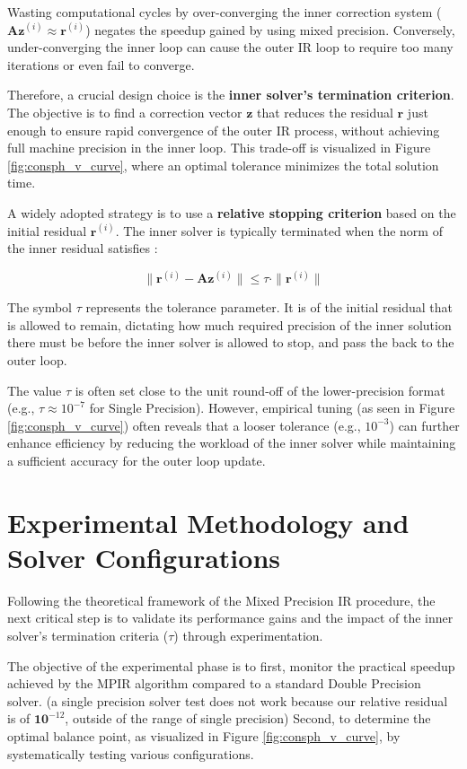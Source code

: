 \documentclass[a4paper,10.5pt,twoside]{article}
\begin{document}
Wasting computational cycles by over-converging the inner correction system ($\mathbf{A}\mathbf{z}^{(i)} \approx \mathbf{r}^{(i)}$) negates the speedup gained by using mixed precision. Conversely, under-converging the inner loop can cause the outer IR loop to require too many iterations or even fail to converge.

Therefore, a crucial design choice is the \textbf{inner solver's termination criterion}. The objective is to find a correction vector $\mathbf{z}$ that reduces the residual $\mathbf{r}$ just enough to ensure rapid convergence of the outer IR process, without achieving full machine precision in the inner loop. This trade-off is visualized in Figure \ref{fig:consph_v_curve}, where an optimal tolerance minimizes the total solution time.

A widely adopted strategy is to use a \textbf{relative stopping criterion} based on the initial residual $\mathbf{r}^{(i)}$. The inner solver is typically terminated when the norm of the inner residual satisfies \autocite{Carson2018}:

\[
\|\mathbf{r}^{(i)} - \mathbf{A}\mathbf{z}^{(i)}\| \le \tau \cdot \|\mathbf{r}^{(i)}\|
\]

The symbol $\tau$ represents the tolerance parameter. It is of the initial residual that is allowed to remain,  dictating how much required precision of the inner solution there must be before the inner solver is allowed to stop, and pass the back to the outer loop. 

The value $\tau$ is often set close to the unit round-off of the lower-precision format (e.g., $\tau \approx 10^{-7}$ for Single Precision). However, empirical tuning (as seen in Figure \ref{fig:consph_v_curve}) often reveals that a looser tolerance (e.g., $10^{-3}$) can further enhance efficiency by reducing the workload of the inner solver while maintaining a sufficient accuracy for the outer loop update. 

\section{Experimental Methodology and Solver Configurations}\label{s:III}

Following the theoretical framework of the Mixed Precision IR procedure, the next critical step is to validate its performance gains and the impact of the inner solver's termination criteria ($\tau$) through experimentation. 

The objective of the experimental phase is to first, monitor the practical speedup achieved by the MPIR algorithm compared to a standard Double Precision solver. (a single precision solver test does not work because our relative residual is of $\mathbf{10}^{-12}$, outside of the range of single precision) Second, to determine the optimal balance point, as visualized in Figure \ref{fig:consph_v_curve}, by systematically testing various configurations.
\end{document}

